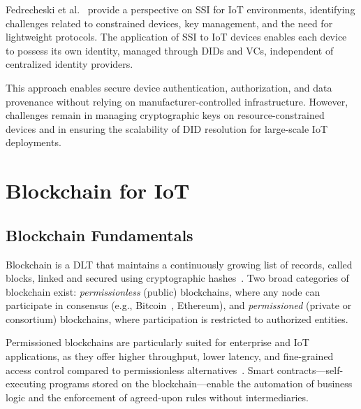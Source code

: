 Fedrecheski et al.~\cite{fedrecheski:rabaey:costa:etal:2020} provide a perspective on \ac{SSI} for \ac{IoT} environments, identifying challenges related to constrained devices, key management, and the need for lightweight protocols.
The application of \ac{SSI} to \ac{IoT} devices enables each device to possess its own identity, managed through \acp{DID} and \acp{VC}, independent of centralized identity providers.

This approach enables secure device authentication, authorization, and data provenance without relying on manufacturer-controlled infrastructure.
However, challenges remain in managing cryptographic keys on resource-constrained devices and in ensuring the scalability of \ac{DID} resolution for large-scale \ac{IoT} deployments.

\section{Blockchain for IoT}
\label{sec:blockchain}

\subsection{Blockchain Fundamentals}
\label{subsec:blockchain-fundamentals}

\noindent Blockchain is a \ac{DLT} that maintains a continuously growing list of records, called blocks, linked and secured using cryptographic hashes~\cite{zheng:xie:dai:chen:wang:2018}.
Two broad categories of blockchain exist: \emph{permissionless} (public) blockchains, where any node can participate in consensus (e.g., Bitcoin~\cite{nakamoto:2008}, Ethereum), and \emph{permissioned} (private or consortium) blockchains, where participation is restricted to authorized entities.

Permissioned blockchains are particularly suited for enterprise and \ac{IoT} applications, as they offer higher throughput, lower latency, and fine-grained access control compared to permissionless alternatives~\cite{androulaki:barger:bortnikov:etal:2018}.
Smart contracts---self-executing programs stored on the blockchain---enable the automation of business logic and the enforcement of agreed-upon rules without intermediaries.

